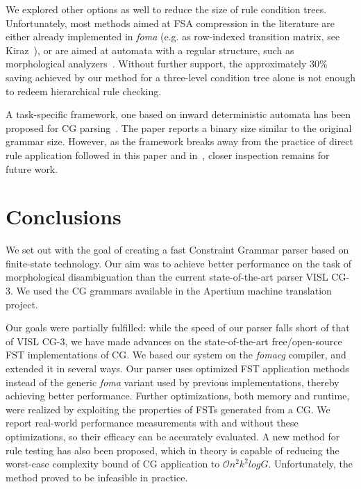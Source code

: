 \documentclass[11pt]{article}
\begin{document}
We explored other options as well to reduce the size of rule condition trees.
Unfortunately, most methods aimed at FSA compression in the literature are
either already implemented in \emph{foma} (e.g. as row-indexed transition matrix,
see Kiraz~), or are aimed at automata with a regular structure,
such as morphological analyzers~\cite{Huet:2003,Huet:2005,Drobac:2014}. Without
further support, the approximately 30\% saving achieved by our method for a
three-level condition tree alone is not enough to redeem hierarchical rule
checking.

A task-specific framework, one based on inward deterministic automata has
been proposed for CG parsing~\cite{Yli-Jyra:2011}. The paper reports a binary
size similar to the original grammar size. However, as the framework breaks away
from the practice of direct rule application followed in this paper and
in~\cite{Hulden:2011,Peltonen:2011}, closer inspection remains for future work. 


\section{Conclusions}
\label{sec:conclusion}
We set out with the goal of creating a fast Constraint Grammar parser based on
finite-state technology. Our aim was to achieve better performance on the task
of morphological disambiguation than the current state-of-the-art parser
VISL CG-3. We used the CG grammars available in the Apertium machine translation
project.

Our goals were partially fulfilled: while the speed of our parser falls short
of that of VISL CG-3, we have made advances on the state-of-the-art
free/open-source FST implementations of CG. We based our system on the
\emph{fomacg} compiler, and extended it in several ways. Our parser  %
uses optimized FST application methods instead of the generic \emph{foma} variant
used by previous implementations, thereby achieving better performance.
Further optimizations, both memory and runtime, were realized
by exploiting the properties of FSTs generated from a CG. We report real-world
performance measurements with and without these optimizations, so their efficacy
can be accurately evaluated.
A new method for rule testing has also been proposed, which in theory is capable
of reducing the worst-case complexity bound of CG application to
$\mathcal{O}n^2k^2logG$. Unfortunately, the method proved to be infeasible in
practice.
\end{document}
